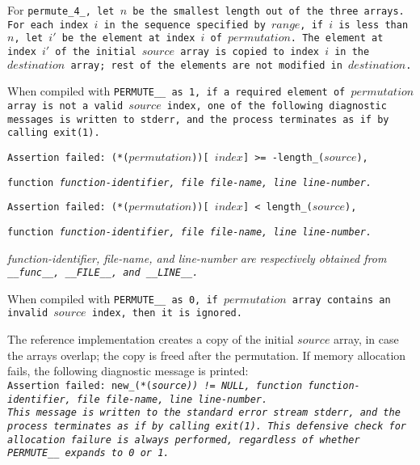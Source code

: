 For \tt{permute_4_}, let $n$ be the smallest length out of the three arrays.
For each index $i$ in the sequence specified by $range$,
if $i$ is less than $n$, let $i'$ be the element at index $i$ of $permutation$.
The element at index $i'$ of the initial $source$ array is copied to index $i$ in
the $destination$ array; rest of the elements are not modified in $destination$.

When compiled with \tt{PERMUTE__} as \tt{1}, if a required
element of $permutation$ array is not a valid $source$ index,
one of the following diagnostic messages is written to \tt{stderr},
and the process terminates as if by calling \tt{exit(1)}.

\begin{center}
\tt{Assertion failed: (*(}$permutation$\tt{))[}%
$index$\tt{] >= -length_(}$source$\tt{),}

\tt{function} \it{function-identifier}\tt{,}
\tt{file}     \it{file-name}\tt{,}
\tt{line}     \it{line-number}\tt{.}
\end{center}

\begin{center}
\tt{Assertion failed: (*(}$permutation$\tt{))[}%
$index$\tt{] <   length_(}$source$\tt{),}

\tt{function} \it{function-identifier}\tt{,}
\tt{file}     \it{file-name}\tt{,}
\tt{line}     \it{line-number}\tt{.}
\end{center}

\it{function-identifier}, \it{file-name}, and \it{line-number} are
respectively obtained from \tt{__func__}, \tt{__FILE__}, and \tt{__LINE__}.

When compiled with \tt{PERMUTE__} as \tt{0}, if $permutation$
array contains an invalid $source$ index, then it is ignored.

\note The reference implementation creates a copy of the initial $source$
array, in case the arrays overlap; the copy is freed after the permutation.
If memory allocation fails, the following diagnostic message is printed:\\

\noindent
\tt{Assertion failed:} \tt{new_(*(}\it{source}\tt{)) != NULL, function}
\it{function-identifier}\tt{, file}
\it{file-name}\tt{, line}
\it{line-number}\tt{.}\\

This message is written to the standard error stream \tt{stderr},
and the process terminates as if by calling \tt{exit(1)}.
This defensive check for allocation failure is always performed,
regardless of whether \tt{PERMUTE__} expands to \tt{0} or \tt{1}.
